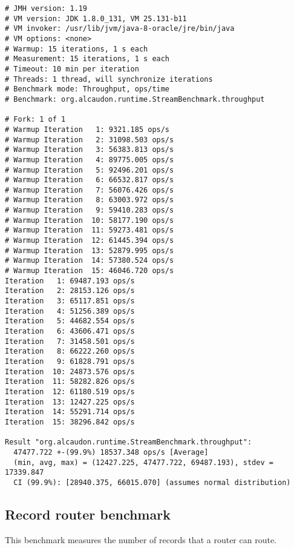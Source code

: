 \begin{lstlisting}
# JMH version: 1.19
# VM version: JDK 1.8.0_131, VM 25.131-b11
# VM invoker: /usr/lib/jvm/java-8-oracle/jre/bin/java
# VM options: <none>
# Warmup: 15 iterations, 1 s each
# Measurement: 15 iterations, 1 s each
# Timeout: 10 min per iteration
# Threads: 1 thread, will synchronize iterations
# Benchmark mode: Throughput, ops/time
# Benchmark: org.alcaudon.runtime.StreamBenchmark.throughput

# Fork: 1 of 1
# Warmup Iteration   1: 9321.185 ops/s
# Warmup Iteration   2: 31098.503 ops/s
# Warmup Iteration   3: 56383.813 ops/s
# Warmup Iteration   4: 89775.005 ops/s
# Warmup Iteration   5: 92496.201 ops/s
# Warmup Iteration   6: 66532.817 ops/s
# Warmup Iteration   7: 56076.426 ops/s
# Warmup Iteration   8: 63003.972 ops/s
# Warmup Iteration   9: 59410.283 ops/s
# Warmup Iteration  10: 58177.190 ops/s
# Warmup Iteration  11: 59273.481 ops/s
# Warmup Iteration  12: 61445.394 ops/s
# Warmup Iteration  13: 52879.995 ops/s
# Warmup Iteration  14: 57380.524 ops/s
# Warmup Iteration  15: 46046.720 ops/s
Iteration   1: 69487.193 ops/s
Iteration   2: 28153.126 ops/s
Iteration   3: 65117.851 ops/s
Iteration   4: 51256.389 ops/s
Iteration   5: 44682.554 ops/s
Iteration   6: 43606.471 ops/s
Iteration   7: 31458.501 ops/s
Iteration   8: 66222.260 ops/s
Iteration   9: 61828.791 ops/s
Iteration  10: 24873.576 ops/s
Iteration  11: 58282.826 ops/s
Iteration  12: 61180.519 ops/s
Iteration  13: 12427.225 ops/s
Iteration  14: 55291.714 ops/s
Iteration  15: 38296.842 ops/s

Result "org.alcaudon.runtime.StreamBenchmark.throughput":
  47477.722 +-(99.9%) 18537.348 ops/s [Average]
  (min, avg, max) = (12427.225, 47477.722, 69487.193), stdev = 17339.847
  CI (99.9%): [28940.375, 66015.070] (assumes normal distribution)
\end{lstlisting}

\subsection{Record router benchmark}

This benchmark measures the number of records that a router can route.


